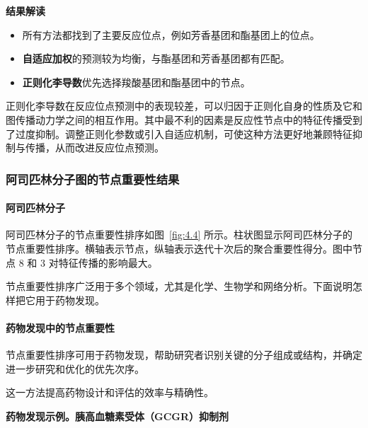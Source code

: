 \textbf{结果解读}
\begin{itemize}
  \item 所有方法都找到了主要反应位点，例如芳香基团和酯基团上的位点。
  \item \textbf{自适应加权}的预测较为均衡，与酯基团和芳香基团都有匹配。
  \item \textbf{正则化李导数}优先选择羧酸基团和酯基团中的节点。
\end{itemize}

正则化李导数在反应位点预测中的表现较差，可以归因于正则化自身的性质及它和图传播动力学之间的相互作用。其中最不利的因素是反应性节点中的特征传播受到了过度抑制。调整正则化参数或引入自适应机制，可使这种方法更好地兼顾特征抑制与传播，从而改进反应位点预测。

\subsubsection{阿司匹林分子图的节点重要性结果}
\paragraph{阿司匹林分子}
阿司匹林分子的节点重要性排序如图~\ref{fig:4.4} 所示。柱状图显示阿司匹林分子的节点重要性排序。横轴表示节点，纵轴表示迭代十次后的聚合重要性得分。图中节点 8 和 3 对特征传播的影响最大。

节点重要性排序广泛用于多个领域，尤其是化学、生物学和网络分析。下面说明怎样把它用于药物发现。

\paragraph{药物发现中的节点重要性}
节点重要性排序可用于药物发现，帮助研究者识别关键的分子组成或结构，并确定进一步研究和优化的优先次序。
\begin{figure}[htbp]
  \centering
  
\end{figure}
这一方法提高药物设计和评估的效率与精确性。

\textbf{药物发现示例。胰高血糖素受体（GCGR）抑制剂}

